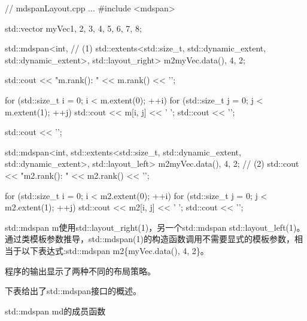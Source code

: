 \begin{cpp}
// mdspanLayout.cpp
...
#include <mdspan>

std::vector myVec{1, 2, 3, 4, 5, 6, 7, 8};

std::mdspan<int, // (1)
	std::extents<std::size_t, std::dynamic_extent, std::dynamic_extent>,
	std::layout_right> m2{myVec.data(), 4, 2};

std::cout << "m.rank(): " << m.rank() << '\n';

for (std::size_t i = 0; i < m.extent(0); ++i) {
	for (std::size_t j = 0; j < m.extent(1); ++j) {
		std::cout << m[i, j] << ' ';
	}
	std::cout << '\n';
}

std::cout << '\n';

std::mdspan<int,
	std::extents<std::size_t, std::dynamic_extent, std::dynamic_extent>,
	std::layout_left> m2{myVec.data(), 4, 2}; // (2)
std::cout << "m2.rank(): " << m2.rank() << '\n';

for (std::size_t i = 0; i < m2.extent(0); ++i) {
	for (std::size_t j = 0; j < m2.extent(1); ++j) {
		std::cout << m2[i, j] << ' ';
	}
	std::cout << '\n';
}
\end{cpp}

std::mdspan m使用std::layout\_right(1)，另一个std::mdspan std::layout\_left(1)。通过类模板参数推导，std::mdspan(1)的构造函数调用不需要显式的模板参数，相当于以下表达式:std::mdspan m2\{myVec.data(), 4, 2\}。

程序的输出显示了两种不同的布局策略。


下表给出了std::mdspan接口的概述。

\begin{center}
std::mdspan md的成员函数
\end{center}

